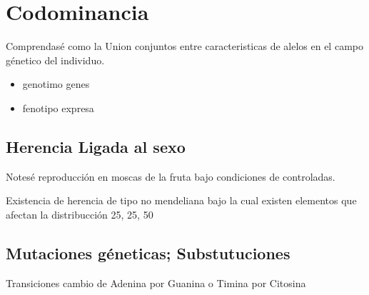 \section{Codominancia}

Comprendasé como la Union conjuntos entre caracteristicas de alelos en el campo génetico del individuo. 

\begin{itemize}
  \item genotimo genes
  \item fenotipo expresa
\end{itemize}

\subsection{Herencia Ligada al sexo}

Notesé reproducción en moscas de la fruta bajo condiciones de controladas. 

Existencia de herencia de tipo no mendeliana bajo la cual existen elementos que afectan la distribucción 25, 25, 50

\subsection{Mutaciones géneticas; Substutuciones}

Transiciones cambio de Adenina por Guanina o Timina por Citosina

